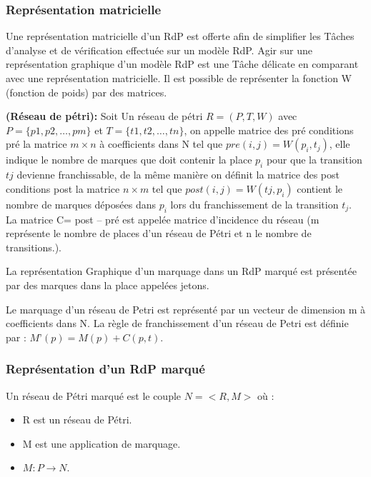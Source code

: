 \subsubsection*{ Représentation matricielle} 
Une représentation matricielle d'un RdP est offerte afin de simplifier les Tâches d'analyse et de vérification effectuée sur un modèle RdP. Agir sur une représentation graphique d'un modèle RdP est une Tâche délicate en comparant avec une représentation matricielle. Il   est possible de représenter la fonction W (fonction de poids) par des matrices.\parencite{Rdp}

\begin{defn}\textbf{\textbf{(Réseau de pétri):}}
	Soit Un réseau de pétri $ R= (P, T, W) $ avec $ P= \{p1, p2, …, pm\} $ et $ T= \{t1, t2, …,tn \}$, on appelle matrice des pré conditions   pré la matrice  $  m \times n $   à coefficients dans  N  tel que $ pre (i,j)= W(p_{i}, t_{j}) $,  elle indique le nombre de marques que doit contenir la place $p_{i}$ pour que la transition $ tj $  devienne franchissable, de la même manière on définit la matrice des post conditions post  la matrice $ n  \times m $ tel que $ post (i,j)= W(tj,  p_{i}) $ contient le nombre de   marques déposées dans $p_{i}$ lors du franchissement de la transition $t_{j}$. La matrice C= post – pré est appelée matrice d'incidence du réseau (m représente le nombre de places d'un réseau de Pétri et n le nombre de transitions.). 
\end{defn}

La représentation Graphique d’un marquage dans un RdP marqué est présentée par des marques dans la place appelées jetons. 

Le marquage d'un réseau de Petri est représenté par un vecteur de dimension m à coefficients dans N. La règle de franchissement d'un réseau de Petri est définie par :    $     M’ (p) =M (p) +  C (p, t).  $



\subsubsection*{Représentation d’un RdP marqué }

Un réseau de Pétri marqué est le couple $ N = < R , M > $ où : 
\begin{itemize}
	\item R est un réseau de Pétri. 
	\item M est une application de marquage.  
	\item $  M : P \to N  $. 
\end{itemize}



